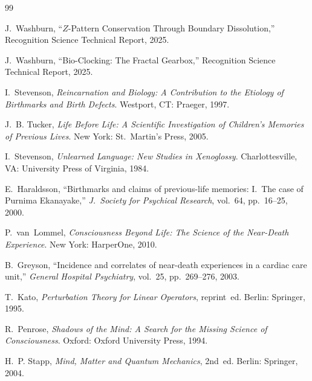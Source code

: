 \documentclass[11pt,a4paper]{article}
\theoremstyle{definition}
\begin{document}
\begin{thebibliography}{99}

J.~Washburn,
``$Z$-Pattern Conservation Through Boundary Dissolution,''
Recognition Science Technical Report, 2025.

J.~Washburn,
``Bio-Clocking: The Fractal Gearbox,''
Recognition Science Technical Report, 2025.

I.~Stevenson,
\textit{Reincarnation and Biology: A Contribution to the Etiology
of Birthmarks and Birth Defects}.
Westport, CT: Praeger, 1997.

J.~B. Tucker,
\textit{Life Before Life: A Scientific Investigation of
Children's Memories of Previous Lives}.
New York: St.\ Martin's Press, 2005.

I.~Stevenson,
\textit{Unlearned Language: New Studies in Xenoglossy}.
Charlottesville, VA: University Press of Virginia, 1984.

E.~Haraldsson,
``Birthmarks and claims of previous-life memories: I.\ The case
of Purnima Ekanayake,''
\textit{J.\ Society for Psychical Research}, vol.~64, pp.~16--25,
2000.

P.~van~Lommel,
\textit{Consciousness Beyond Life: The Science of the
Near-Death Experience}.
New York: HarperOne, 2010.

B.~Greyson,
``Incidence and correlates of near-death experiences in a cardiac
care unit,''
\textit{General Hospital Psychiatry}, vol.~25, pp.~269--276, 2003.

T.~Kato,
\textit{Perturbation Theory for Linear Operators}, reprint~ed.
Berlin: Springer, 1995.

R.~Penrose,
\textit{Shadows of the Mind: A Search for the Missing Science of
Consciousness}.
Oxford: Oxford University Press, 1994.

H.~P. Stapp,
\textit{Mind, Matter and Quantum Mechanics}, 2nd~ed.
Berlin: Springer, 2004.

\end{thebibliography}
\end{document}
